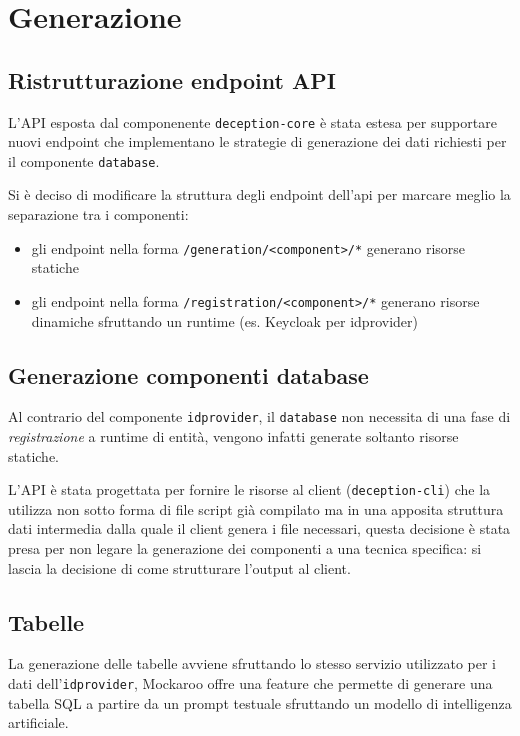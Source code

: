 \section{Generazione}

\subsection{Ristrutturazione endpoint API}

L'API esposta dal componenente \texttt{deception-core} è stata estesa per supportare nuovi endpoint che implementano le strategie di generazione dei dati richiesti per il componente \texttt{database}.

Si è deciso di modificare la struttura degli endpoint dell'api per marcare meglio la separazione tra i componenti:
\begin{itemize}
    \item gli endpoint nella forma \texttt{/generation/<component>/*} generano risorse statiche
    \item gli endpoint nella forma \texttt{/registration/<component>/*} generano risorse dinamiche sfruttando un runtime (es. Keycloak per idprovider)
\end{itemize}

\subsection{Generazione componenti database}

Al contrario del componente \texttt{idprovider}, il \texttt{database} non necessita di una fase di \textit{registrazione} a runtime di entità, vengono infatti generate soltanto risorse statiche.

L'API è stata progettata per fornire le risorse al client (\texttt{deception-cli}) che la utilizza non sotto forma di file script già compilato ma in una apposita struttura dati intermedia dalla quale il client genera i file necessari, questa decisione è stata presa per non legare la generazione dei componenti a una tecnica specifica: si lascia la decisione di come strutturare l'output al client.

\subsection{Tabelle}
La generazione delle tabelle avviene sfruttando lo stesso servizio utilizzato per i dati dell'\texttt{idprovider}, Mockaroo offre una feature che permette di generare una tabella SQL a partire da un prompt testuale sfruttando un modello di intelligenza artificiale.

